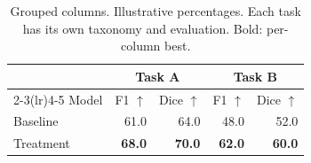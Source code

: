 \begin{table}[!htbp]
\centering\small
\begin{tabular}{lrrrr}
\toprule
& \multicolumn{2}{c}{Task A} & \multicolumn{2}{c}{Task B} \\
\cmidrule(lr){2-3}\cmidrule(lr){4-5}
Model & F1 $\uparrow$ & Dice $\uparrow$ & F1 $\uparrow$ & Dice $\uparrow$ \\
\midrule
Baseline & 61.0 & 64.0 & 48.0 & 52.0 \\
Treatment & \textbf{68.0} & \textbf{70.0} & \textbf{62.0} & \textbf{60.0} \\
\bottomrule
\end{tabular}
\caption{Grouped columns. Illustrative percentages. Each task has its own taxonomy and evaluation. Bold: per-column best.}
\label{tab:grouped-columns}
\end{table}
